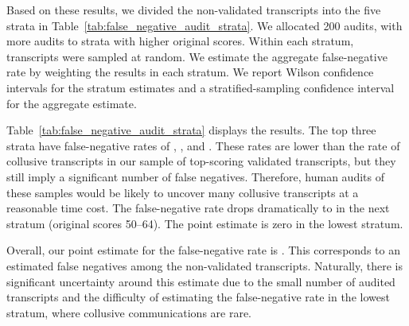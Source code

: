 Based on these results, we divided the non-validated transcripts into the five strata in Table~\ref{tab:false_negative_audit_strata}. We allocated 200 audits, with more audits to strata with higher original scores. Within each stratum, transcripts were sampled at random. We estimate the aggregate false-negative rate by weighting the results in each stratum. We report Wilson confidence intervals for the stratum estimates and a stratified-sampling confidence interval for the aggregate estimate.

Table~\ref{tab:false_negative_audit_strata} displays the results. The top three strata have false-negative rates of , , and . These rates are lower than the  rate of collusive transcripts in our sample of top-scoring validated transcripts, but they still imply a significant number of false negatives. Therefore, human audits of these samples would be likely to uncover many collusive transcripts at a reasonable time cost. The false-negative rate drops dramatically to  in the next stratum (original scores 50--64). The point estimate is zero in the lowest stratum.

Overall, our point estimate for the false-negative rate is . This corresponds to an estimated  false negatives among the  non-validated transcripts. Naturally, there is significant uncertainty around this estimate due to the small number of audited transcripts and the difficulty of estimating the false-negative rate in the lowest stratum, where collusive communications are rare.


